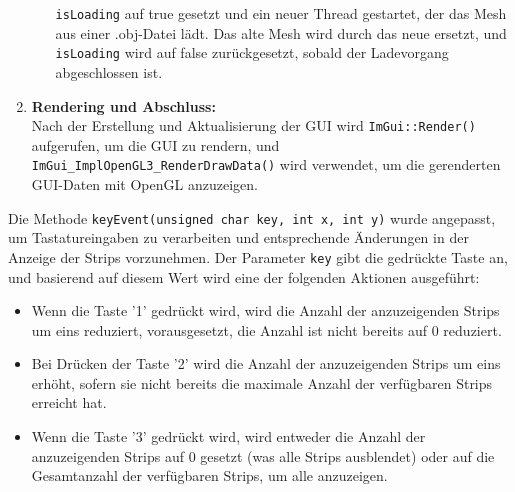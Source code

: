 \begin{enumerate}
\begin{itemize}
        \lstinline{isLoading} auf true gesetzt und ein neuer Thread gestartet, der das Mesh
        aus einer .obj-Datei lädt. Das alte Mesh wird durch das neue ersetzt,
        und \lstinline{isLoading} wird auf false zurückgesetzt, sobald der Ladevorgang
        abgeschlossen ist.
    \end{itemize} 
    \hfil \break
    \item \textbf{Rendering und Abschluss:} 
    \\ 
    Nach der Erstellung und Aktualisierung der GUI wird \lstinline{ImGui::Render()}
    aufgerufen, um die GUI zu rendern, und \lstinline{ImGui_ImplOpenGL3_RenderDrawData()}
    wird verwendet, um die gerenderten GUI-Daten mit OpenGL anzuzeigen.
\end{enumerate}
\hfil \break
Die Methode \lstinline{keyEvent(unsigned char key, int x, int y)} wurde angepasst, um
Tastatureingaben zu verarbeiten und entsprechende Änderungen in der Anzeige der
Strips vorzunehmen. Der Parameter \lstinline{key} gibt die gedrückte Taste an, und basierend
auf diesem Wert wird eine der folgenden Aktionen ausgeführt:
\\
\begin{itemize}
    \item Wenn die Taste '1' gedrückt wird, wird die Anzahl der anzuzeigenden Strips
    um eins reduziert, vorausgesetzt, die Anzahl ist nicht bereits auf 0 reduziert.
    \\
    \item Bei Drücken der Taste '2' wird die Anzahl der anzuzeigenden Strips um eins
    erhöht, sofern sie nicht bereits die maximale Anzahl der verfügbaren Strips
    erreicht hat.
    \\
    \item Wenn die Taste '3' gedrückt wird, wird entweder die Anzahl
    der anzuzeigenden Strips auf 0 gesetzt (was alle Strips ausblendet) oder auf die
    Gesamtanzahl der verfügbaren Strips, um alle anzuzeigen.
\end{itemize}
